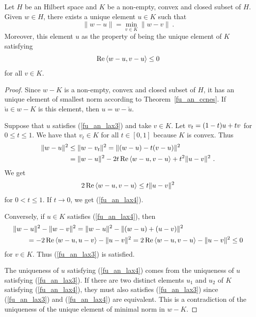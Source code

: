 \begin{prop} \label{fu_an_pre_lax}
Let $H$ be an Hilbert space and $K$ be a non-empty, convex and
closed subset of $H$.  Given $w\in H$, there exists a unique element
$u \in K$ such that
\begin{equation} \label{fu_an_lax3}
\| w-u\| = \min_{v\in K} \|w-v\| \ .
\end{equation}
Moreover, this element $u$ as the property of being the unique element
of $K$ satisfying
\begin{equation} \label{fu_an_lax4}
\operatorname{Re} \left\langle{w-u} , {v-u}\right\rangle \leq 0
\end{equation}
for all $v \in K$.
\end{prop}

\begin{proof}
Since $w-K$ is a non-empty, convex and closed subset of $H$, it has an
unique element of smallest norm according to
Theorem~\ref{fu_an_ccnes}.  If $\breve{u} \in w-K$ is this element, then
$u= w - \breve{u}$.

Suppose that $u$ satisfies (\ref{fu_an_lax3}) and take $v \in K$.  Let
$\displaystyle v_t = (1-t)u+t v$ for $0\leq t \leq 1$.  We have that
$v_t \in K$ for all $t \in [0,1]$ because $K$ is convex.  Thus
\begin{align*}
\| w-u\|^2 &\leq \| w - v_t\|^2 = \|(w-u) -t(v-u)\|^2 \\
&= \|w-u\|^2 - 2t \operatorname{Re} \left\langle{w-u} , {v-u}\right\rangle + t^2 \|u-v\|^2 \ .
\end{align*}
We get
\[
2\operatorname{Re} \left\langle{w-u} , {v-u}\right\rangle \leq t \|u-v\|^2
\]
for $0<t \leq 1$.  If $t\rightarrow 0$, we get (\ref{fu_an_lax4}).

Conversely, if $u\in K$ satisfies (\ref{fu_an_lax4}), then
\begin{align*}
&\|w-u\|^2 - \|w-v\|^2
= \|w-u\|^2 - \|(w-u) + (u-v)\|^2 \\
&\qquad = -2 \operatorname{Re} \left\langle{w-u} , {u-v}\right\rangle  - \|u-v\|^2
= 2 \operatorname{Re} \left\langle{w-u} , {v-u}\right\rangle - \|u-v\|^2\leq 0
\end{align*}
for $v\in K$.  Thus (\ref{fu_an_lax3}) is satisfied.

The uniqueness of $u$ satisfying (\ref{fu_an_lax4}) comes from the
uniqueness of $u$ satisfying (\ref{fu_an_lax3}).  If there are two
distinct elements $u_1$ and $u_2$ of $K$ satisfying
(\ref{fu_an_lax4}), they must also satisfies (\ref{fu_an_lax3}) since
(\ref{fu_an_lax3}) and (\ref{fu_an_lax4}) are equivalent.  This is a
contradiction of the uniqueness of the unique element of minimal norm
in $w - K$.
\end{proof}

